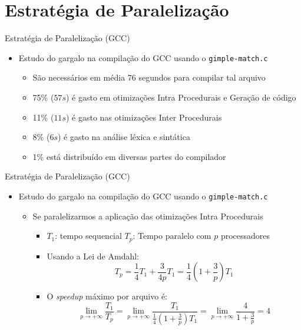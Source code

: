 \section{Estratégia de Paralelização}

\begin{frame}{Estratégia de Paralelização (GCC)}
    \begin{itemize}
        \item Estudo do gargalo na compilação do GCC usando o \texttt{gimple-match.c}
            \begin{itemize}
                \item São necessários em média 76 segundos para compilar tal arquivo
                \item 75\% ($57s$) é gasto em otimizações Intra Procedurais e Geração de código
                \item 11\% ($11s$) é gasto nas otimizações Inter Procedurais
                \item 8\% ($6s$) é gasto na análise léxica e sintática
                \item 1\% está distribuído em diversas partes do compilador
            \end{itemize}
    \end{itemize}
\end{frame}

\begin{frame}{Estratégia de Paralelização (GCC)}
    \begin{itemize}
        \item Estudo do gargalo na compilação do GCC usando o \texttt{gimple-match.c}
            \begin{itemize}
                \item Se paralelizarmos a aplicação das otimizações Intra Procedurais
            \begin{itemize}
                \item $T_1$: tempo sequencial \hfil\hfil $T_p$: Tempo paralelo com $p$ processadores
                \item Usando a Lei de Amdahl:
$$ T_p = \frac{1}{4} T_1 + \frac{3}{4p}T_1 = \frac{1}{4} \left( 1 + \frac{3}{p}
\right)T_1 $$ 
                \item O \textit{speedup} máximo por arquivo é: $$
\lim_{p \rightarrow +\infty} \frac{T_1}{T_p} = \lim_{p \rightarrow +\infty}
\frac{T_1}{\frac{1}{4} \left( 1 + \frac{3}{p} \right)T_1} = \lim_{p \rightarrow
+\infty} \frac{4}{1 + \frac{3}{p}} = 4$$
            \end{itemize}
            \end{itemize}
    \end{itemize}
\end{frame}


